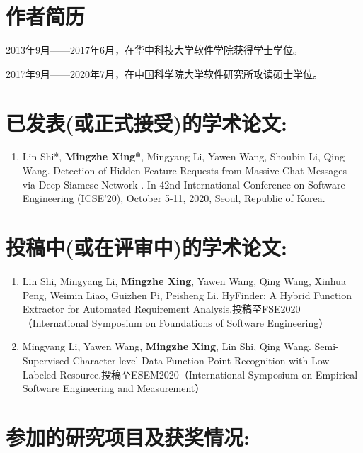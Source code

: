 
\section*{作者简历}

2013年9月——2017年6月，在华中科技大学软件学院获得学士学位。

2017年9月——2020年7月，在中国科学院大学软件研究所攻读硕士学位。

\section*{已发表(或正式接受)的学术论文:}

{
\setlist[enumerate]{}%
\begin{enumerate}[nosep]
    \item Lin Shi*, \textbf{Mingzhe Xing*}, Mingyang Li, Yawen Wang, Shoubin Li, Qing Wang. Detection of Hidden Feature Requests from Massive Chat Messages via Deep Siamese Network . In 42nd International Conference on Software Engineering (ICSE’20), October 5-11, 2020, Seoul, Republic of Korea.
\end{enumerate}
}

\section*{投稿中(或在评审中)的学术论文:}

{
\setlist[enumerate]{}%
\begin{enumerate}[nosep]
    \item Lin Shi, Mingyang Li, \textbf{Mingzhe Xing}, Yawen Wang, Qing Wang, Xinhua Peng, Weimin Liao, Guizhen Pi, Peisheng Li. HyFinder: A Hybrid Function Extractor for Automated Requirement Analysis.投稿至FSE2020（International Symposium on Foundations of Software Engineering）
    \item Mingyang Li, Yawen Wang, \textbf{Mingzhe Xing}, Lin Shi, Qing Wang. Semi-Supervised Character-level Data Function Point Recognition with Low Labeled Resource.投稿至ESEM2020（International Symposium on Empirical Software Engineering and Measurement）
\end{enumerate}
}


\section*{参加的研究项目及获奖情况:}

